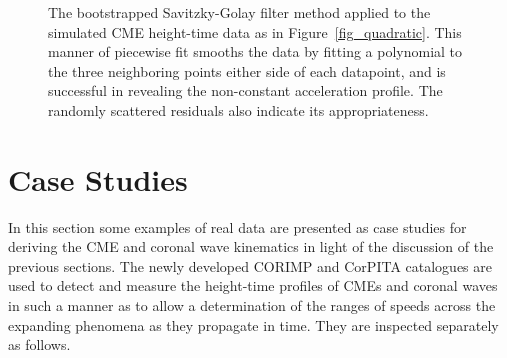 \documentclass[structabstract]{aa}
\begin{document}
\begin{figure}[t]
\centering
{}
\caption{The bootstrapped Savitzky-Golay filter method applied to the simulated CME height-time data as in Figure~\ref{fig_quadratic}. This manner of piecewise fit smooths the data by fitting a polynomial to the three neighboring points either side of each datapoint, and is successful in revealing the non-constant acceleration profile. The randomly scattered residuals also indicate its appropriateness.}
\label{fig_savgol}
\end{figure}


\section{Case Studies}
\label{sect:case_studies}

In this section some examples of real data are presented as case studies for deriving the CME and coronal wave kinematics in light of the discussion of the previous sections. The newly developed CORIMP and CorPITA catalogues are used to detect and measure the height-time profiles of CMEs and coronal waves in such a manner as to allow a determination of the ranges of speeds across the expanding phenomena as they propagate in time. They are inspected separately as follows.
\end{document}
